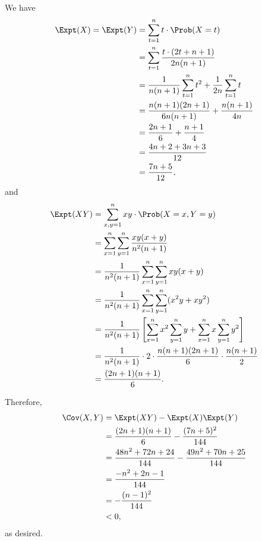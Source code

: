 \begin{enumerate}
          We have
          \begin{align*}
              \Expt(X) = \Expt(Y) & = \sum_{t = 1}^{n} t \cdot \Prob(X = t)                                   \\
                                  & = \sum_{t = 1}^{n} \frac{t \cdot (2t + n + 1)}{2n(n+1)}                   \\
                                  & = \frac{1}{n(n+1)} \sum_{t = 1}^{n} t^2 + \frac{1}{2n} \sum_{t = 1}^{n} t \\
                                  & = \frac{n(n+1)(2n+1)}{6n(n+1)} + \frac{n(n+1)}{4n}                        \\
                                  & = \frac{2n+1}{6} + \frac{n+1}{4}                                          \\
                                  & = \frac{4n+2+3n+3}{12}                                                    \\
                                  & = \frac{7n+5}{12},
          \end{align*}
          and
          \begin{align*}
              \Expt(XY) & = \sum_{x, y = 1}^{n} xy \cdot \Prob(X = x, Y = y)                                                                  \\
                        & = \sum_{x = 1}^{n} \sum_{y = 1}^{n} \frac{xy(x + y)}{n^2(n+1)}                                                      \\
                        & = \frac{1}{n^2(n+1)} \sum_{x = 1}^{n} \sum_{y = 1}^{n} xy(x + y)                                                    \\
                        & = \frac{1}{n^2(n+1)} \sum_{x = 1}^{n} \sum_{y = 1}^{n} (x^2y + xy^2)                                                \\
                        & = \frac{1}{n^2(n+1)} \left[\sum_{x = 1}^{n} x^2 \sum_{y = 1}^{n} y + \sum_{x = 1}^{n} x \sum_{y = 1}^{n} y^2\right] \\
                        & = \frac{1}{n^2(n+1)} \cdot 2 \cdot \frac{n(n+1)(2n+1)}{6} \cdot \frac{n(n+1)}{2}                                    \\
                        & = \frac{(2n+1)(n+1)}{6}.
          \end{align*}

          Therefore,
          \begin{align*}
              \Cov(X, Y) & = \Expt(XY) - \Expt(X)\Expt(Y)                                \\
                         & = \frac{(2n+1)(n+1)}{6} - \frac{(7n+5)^2}{144}                \\
                         & = \frac{48n^2 + 72n + 24}{144} - \frac{49n^2 + 70n + 25}{144} \\
                         & = \frac{-n^2 + 2n - 1}{144}                                   \\
                         & = -\frac{(n-1)^2}{144}                                        \\
                         & < 0,
          \end{align*}
          as desired.
\end{enumerate}